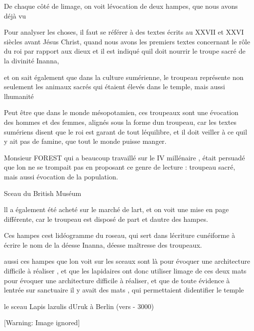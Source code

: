 \documentclass{article}
\begin{document}
De chaque côté de l{\textquotesingle}image, on voit
l{\textquotesingle}évocation de deux hampes, que nous avons déjà vu

Pour analyser les choses, il faut se référer à des textes écrits au
XXVII et XXVI siècles avant Jésus Christ, quand nous avons les premiers
textes concernant le rôle du roi par rapport aux dieux et il est
indiqué qu{\textquotesingle}il doit nourrir le troupe sacré de la
divinité Inanna, 

et on sait également que dans la culture sumérienne, le troupeau
représente non seulement les animaux sacrés qui étaient élevés dans le
temple, mais aussi l{\textquotesingle}humanité

Peut être que dans le monde mésopotamien, ces troupeaux sont une
évocation des hommes et des femmes, alignés sous la forme
d{\textquotesingle}un troupeau, car les textes sumériens disent que le
roi est garant de tout l{\textquotesingle}équilibre, et il doit veiller
à ce qu{\textquotesingle}il {\textquotesingle}y ait pas de famine, que
tout le monde puisse manger.

Monsieur FOREST qui a beaucoup travaillé sur le IV millénaire , était
persuadé que l{\textquotesingle}on ne se trompait pas en proposant ce
genre de lecture : troupeau sacré, mais aussi évocation de la
population.

Sceau du British Muséum

ll a également été acheté sur le marché de l{\textquotesingle}art, et on
voit une mise en page différente, car le troupeau est disposé de part
et d{\textquotesingle}autre des hampes.

Ces hampes c{\textquotesingle}est l{\textquotesingle}idéogramme du
roseau, qui sert dans l{\textquotesingle}écriture cunéiforme à écrire
le nom de la déesse Inanna, déesse maîtresse des troupeaux.

aussi ces hampes que l{\textquotesingle}on voit sur les sceaux sont là
pour évoquer une architecture difficile à réaliser , et que les
lapidaires ont donc utiliser l{\textquotesingle}image de ces deux mats
pour évoquer une architecture difficile à réaliser, et que de toute
évidence à l{\textquotesingle}entrée sur sanctuaire il y avait des mats
, qui permettaient d{\textquotesingle}identifier le temple

le sceau Lapis lazulis d{\textquotesingle}Uruk à Berlin (vers - 3000)

  [Warning: Image ignored] %
 
\end{document}
